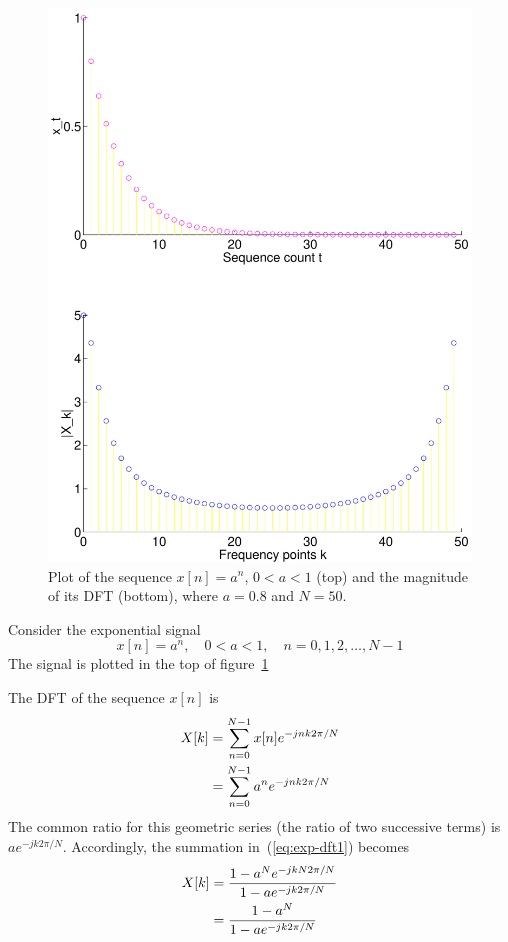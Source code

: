 \begin{figure}
\centerline{\includegraphics[width=5in]{ch-fft/dft_expxX}}
\caption[Plot of the sequence {$x[n] = 0.8^n$} and the
magnitude of its DFT]{Plot of the sequence $x[n] = a^n$, $0<a<1$ (top)
and the magnitude of its DFT (bottom), where $a=0.8$ and $N=50$.
\label{fig:dft-exp-xX}}
\end{figure}

Consider the exponential signal 
\begin{equation}
x[n] = a^n, \quad 0<a<1, \quad n = 0,1,2,\ldots,N-1
\end{equation}
The signal is plotted in the top of figure~\ref{fig:dft-exp-xX}

The DFT of the sequence $x[n]$ is 
\begin{align}
X[k] &= \sum_{n=0}^{N-1} x[n] e^{-jnk2\pi/N} \notag\\
     &= \sum_{n=0}^{N-1} a^n e^{-jnk2\pi/N}
  \label{eq:exp-dft1}
\end{align}
The common ratio for this geometric series (the ratio of two
successive terms) is $ae^{-jk2\pi/N}$.  Accordingly, the summation
in~(\ref{eq:exp-dft1}) becomes
\begin{align}
X[k] &= \frac{1-a^Ne^{-jkN2\pi/N}}{1-ae^{-jk2\pi/N}} \notag\\
     &= \frac{1-a^N}{1-ae^{-jk2\pi/N}}
\end{align}

